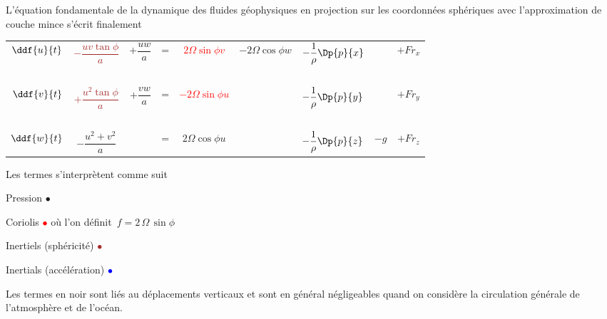 \sk
L'équation fondamentale de la dynamique des fluides géophysiques 
en projection sur les coordonnées sphériques avec l'approximation de couche mince
s'écrit finalement

\begin{center}
\begin{tabular}{ccccccccc}
\textcolor{blue}{$\ddf{u}{t}$} & 
\textcolor{brown}{$-\dfrac{uv\tan\phi}{a}$} & 
$+\dfrac{uw}{a}$ & 
= & 
\textcolor{red}{$2\Omega\sin\phi v$} & 
$-2\Omega \cos\phi w$ & 
\textcolor{green!75!black}{$-\dfrac{1}{\rho}\Dp{p}{x}$} & 
& 
$+Fr_x$\\
~\\
\textcolor{blue}{$\ddf{v}{t}$} & 
\textcolor{brown}{$+\dfrac{u^2\tan\phi}{a}$} & 
$+\dfrac{vw}{a}$ & 
= & 
\textcolor{red}{$-2\Omega\sin\phi u$} &
&
\textcolor{green!75!black}{$-\dfrac{1}{\rho}\Dp{p}{y}$} &
&
$+Fr_y$\\
~\\
$\ddf{w}{t}$ & 
$-\dfrac{u^2+v^2}{a}$ & 
&
=&
$2\Omega\cos\phi u$ & 
& 
\textcolor{green!75!black}{$-\dfrac{1}{\rho}\Dp{p}{z}$} & 
\textcolor{green!75!black}{$ -g$} & 
$+Fr_z$\\ 
\end{tabular}
\end{center}

\sk
Les termes s'interprètent comme suit
\begin{citemize}
\item{Pression} \textcolor{green!75!black}{$\bullet$} 
\item{Coriolis} \textcolor{red}{$\bullet$} où l'on définit~$f = 2 \, \Omega \, \sin\phi$
\item{Inertiels (sphéricité)} \textcolor{brown}{$\bullet$}
\item{Inertials (accélération)} \textcolor{blue}{$\bullet$}
\end{citemize}
Les termes en noir sont liés au déplacements verticaux et sont en général négligeables quand on considère la circulation générale de l'atmosphère et de l'océan.
